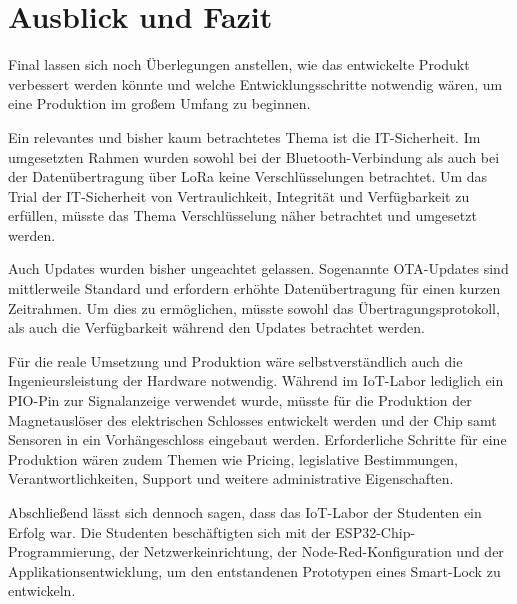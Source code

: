 
\chapter{Ausblick und Fazit}
Final lassen sich noch Überlegungen anstellen, wie das entwickelte Produkt verbessert werden könnte und welche Entwicklungsschritte notwendig wären, um eine Produktion im großem Umfang zu beginnen. 

Ein relevantes und bisher kaum betrachtetes Thema ist die IT-Sicherheit. Im umgesetzten Rahmen wurden sowohl bei der Bluetooth-Verbindung als auch bei der Datenübertragung über \ac{LoRa} keine Verschlüsselungen betrachtet. Um das Trial der IT-Sicherheit von Vertraulichkeit, Integrität und Verfügbarkeit zu erfüllen, müsste das Thema Verschlüsselung näher betrachtet und umgesetzt werden.

Auch Updates wurden bisher ungeachtet gelassen. Sogenannte \ac{OTA}-Updates sind mittlerweile Standard und erfordern erhöhte Datenübertragung für einen kurzen Zeitrahmen. Um dies zu ermöglichen, müsste sowohl das Übertragungsprotokoll, als auch die Verfügbarkeit während den Updates betrachtet werden.

Für die reale Umsetzung und Produktion wäre selbstverständlich auch die Ingenieursleistung der Hardware notwendig. Während im \ac{IoT}-Labor lediglich ein \ac{PIO}-Pin zur Signalanzeige verwendet wurde, müsste für die Produktion der Magnetauslöser des elektrischen Schlosses entwickelt werden und der Chip samt Sensoren in ein Vorhängeschloss eingebaut werden. Erforderliche Schritte für eine Produktion wären zudem Themen wie Pricing, legislative Bestimmungen, Verantwortlichkeiten, Support und weitere administrative Eigenschaften.

Abschließend lässt sich dennoch sagen, dass das \ac{IoT}-Labor der Studenten ein Erfolg war. Die Studenten beschäftigten sich mit der ESP32-Chip-Programmierung, der Netzwerkeinrichtung, der Node-Red-Konfiguration und der Applikationsentwicklung, um den entstandenen Prototypen eines Smart-Lock zu entwickeln.